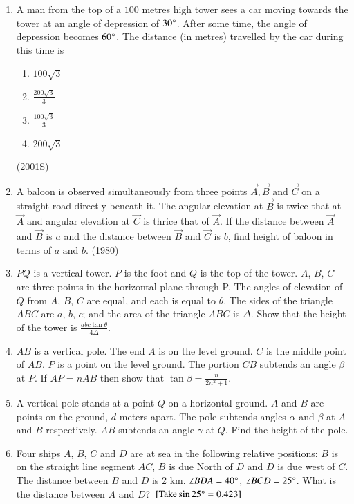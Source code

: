 \begin{enumerate}[label=\thesubsection.\arabic*,ref=\thesubsection.\theenumi]
\item A man from the top of a $100$ metres high tower sees a car moving towards the tower at an angle of depression of $30\degree$. After some time, the angle of depression becomes $60\degree$. The distance (in metres) travelled by the car during this time is
\begin{enumerate}
\item $100\sqrt{3}$
\item $\frac{200\sqrt{3}}{3}$
\item $\frac{100\sqrt{3}}{3}$
\item $200\sqrt{3}$
\end{enumerate}
\hfill (2001S)
     	\item A baloon is observed simultaneously from three points $\vec{A},\vec{B} \text{ and } \vec{C}$ on a straight road directly beneath it. The angular elevation at $\vec{B}$ is twice that at $\vec{A}$ and angular elevation at $\vec{C}$ is thrice that of $\vec{A}$. If the distance between $\vec{A}$ and $\vec{B}$ is $a$ and the distance between $\vec{B}$ and $\vec{C}$ is $b$, find height of baloon in terms of $a \text{ and } b$.
     \hfill {(1980)}
\item $PQ$ is a vertical tower. $P$ is the foot and $Q$ is the top of the tower. $A$, $B$, $C$ are three points in the horizontal plane through P. The angles of elevation of $Q$ from $A$, $B$, $C$ are equal, and each is equal to $\theta$. The sides of the triangle $ABC$ are $a$, $b$, $c$; and the area of the triangle $ABC$ is $\Delta$. Show that the height of the tower is $\frac{abc\tan{\theta}}{4\Delta}$.
\item $AB$ is a vertical pole. The end $A$ is on the level ground. $C$ is the middle point of $AB$. $P$ is a point on the level ground. The portion $CB$ subtends an angle $\beta$ at $P$. If $AP=nAB$ then show that $\tan{\beta}=\frac{n}{2n^2+1}$.

\hfill{}
\item A vertical pole stands at a point $Q$ on a horizontal ground. $A$ and $B$ are points on the ground, $d$ meters apart. The pole subtends angles $\alpha$ and $\beta$ at $A$ and $B$ respectively. $AB$ subtends an angle $\gamma$ at $Q$. Find the height of the pole. 

\hfill{}

\item Four ships $A$, $B$, $C$ and $D$ are at sea in the following relative positions: $B$ is on the straight line segment $AC$, $B$ is due North of $D$ and $D$ is due west of $C$. The distance between $B$ and $D$ is 2 km. $\angle{BDA}=40\degree$, $\angle{BCD}=25\degree$. What is the distance between $A$ and $D$? ${}\left[\text{Take} \sin{25\degree}=0.423\right]$


\end{enumerate}
